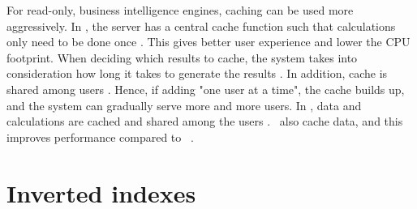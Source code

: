 For read-only, business intelligence engines, caching can be used more aggressively. In \qlikview, the server has a central cache function such that calculations only need to be done once \cite{Qlik2011-ef}. This gives better user experience and lower the CPU footprint. When deciding which results to cache, the system takes into consideration how long it takes to generate the results \cite{noauthor_undateds-js}. In addition, cache is shared among users \cite{Qlik2011-yc}. Hence, if adding "one user at a time", the cache builds up, and the system can gradually serve more and more users. In \tableau, data and calculations are cached and shared among the users \cite{Kamkolkar2015-iq}. \vertipaq~also cache data, and this improves performance compared to \mssql~\cite{Ferrari2012-hm}.

\section{Inverted indexes}
\label{sec:Inverted indexes}
